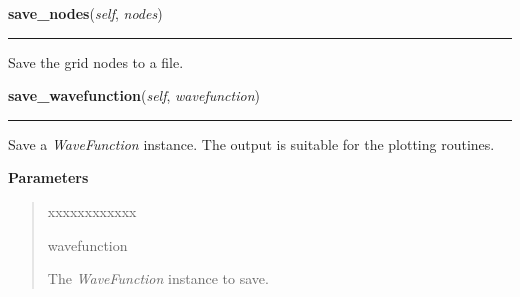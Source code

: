 \hspace{.8\funcindent}\begin{boxedminipage}{\funcwidth}

    \raggedright \textbf{save\_nodes}(\textit{self}, \textit{nodes})

    \vspace{-1.5ex}

    \rule{\textwidth}{0.5\fboxrule}
\setlength{\parskip}{2ex}
    Save the grid nodes to a file.

\setlength{\parskip}{1ex}
    \end{boxedminipage}

    \label{Serializer:Serializer:save_wavefunction}

    \vspace{0.5ex}

\hspace{.8\funcindent}\begin{boxedminipage}{\funcwidth}

    \raggedright \textbf{save\_wavefunction}(\textit{self}, \textit{wavefunction})

    \vspace{-1.5ex}

    \rule{\textwidth}{0.5\fboxrule}
\setlength{\parskip}{2ex}
    Save a \textit{WaveFunction} instance. The output is suitable for the
    plotting routines.

\setlength{\parskip}{1ex}
      \textbf{Parameters}
      \vspace{-1ex}

      \begin{quote}
        \begin{Ventry}{xxxxxxxxxxxx}

          \item[wavefunction]

          The \textit{WaveFunction} instance to save.

        \end{Ventry}

      \end{quote}

    \end{boxedminipage}

    \label{Serializer:Serializer:save_energies}

